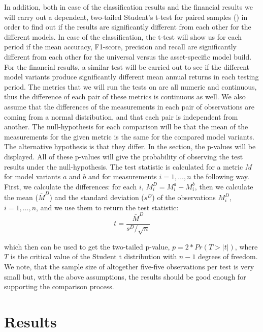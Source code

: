 \documentclass[12pt, a4paper]{article}
\begin{document}
In addition, both in case of the classification results and the financial results we will carry out a dependent, two-tailed Student's t-test for paired samples (\cite{student1908probable}) in order to find out if the results are significantly different from each other for the different models. In case of the classification, the t-test will show us for each period if the mean accuracy, F1-score, precision and recall are significantly different from each other for the universal versus the asset-specific model build. For the financial results, a similar test will be carried out to see if the different model variants produce significantly different mean annual returns in each testing period. The metrics that we will run the tests on are all numeric and continuous, thus the difference of each pair of these metrics is continuous as well. We also assume that the differences of the measurements in each pair of observations are coming from a normal distribution, and that each pair is independent from another. The null-hypothesis for each comparison will be that the mean of the measurements for the given metric is the same for the compared model variants. The alternative hypothesis is that they differ. In the  section, the p-values will be displayed. All of these p-values will give the probability of observing the test results under the null-hypothesis. The test statistic is calculated for a metric $M$ for model variants $a$ and $b$ and for measurements $i = 1, \dots, n$ the following way. First, we calculate the differences: for each $i$, $M_i^D = M_i^a - M_i^b$, then we calculate the mean ($\bar{M}^D$) and the standard deviation ($s^D$) of the observations $M^D_i$, $i = 1, \dots, n$, and we use them to return the test statistic:
\begin{equation}
    \label{eq:ttest}
    t = \frac{\bar{M}^D}{s^D / \sqrt{n}}
\end{equation}

which then can be used to get the two-tailed p-value, $p = 2* Pr(T > |t|)$, where $T$ is the critical value of the Student t distribution with $n-1$ degrees of freedom. We note, that the sample size of altogether five-five observations per test is very small but, with the above assumptions, the results should be good enough for supporting the comparison process.

\section{Results}
\label{sec:ER}
\end{document}
